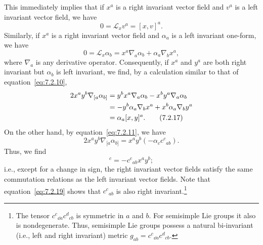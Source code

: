 This immediately implies that if \(x^a\) is a right invariant vector field and
\(v^a\) is a left invariant vector field, we have
\begin{equation}
  0=\mathcal L_xv^a=[x,v]^a .
  \tag{7.2.15}\label{eq:7.2.15}
\end{equation}
Similarly, if \(x^a\) is a right invariant vector field and \(\alpha_a\) is a left
invariant one-form, we have
\begin{equation}
  0=\mathcal L_x\alpha_b
    =x^a\nabla_a\alpha_b+\alpha_a\nabla_bx^a ,
  \tag{7.2.16}\label{eq:7.2.16}
\end{equation}
where \(\nabla_a\) is any derivative operator. Consequently, if \(x^a\) and
\(y^a\) are both right invariant but \(\alpha_b\) is left invariant, we find, by a
calculation similar to that of equation~\eqref{eq:7.2.10},
\begin{align}
  2x^ay^b\nabla_{[a}\alpha_{b]}
    &=y^bx^a\nabla_a\alpha_b-x^by^a\nabla_a\alpha_b \notag\\
    &=-y^b\alpha_a\nabla_bx^a+x^b\alpha_a\nabla_by^a \notag\\
    &=\alpha_a[x,y]^a .
  \tag{7.2.17}\label{eq:7.2.17}
\end{align}
On the other hand, by equation~\eqref{eq:7.2.11}, we have
\begin{equation}
  2x^ay^b\nabla_{[a}\alpha_{b]}
    =x^ay^b(-\alpha_cc^c{}_{ab}) .
  \tag{7.2.18}\label{eq:7.2.18}
\end{equation}
Thus, we find
\begin{equation}
  [x,y]^c=-c^c{}_{ab}x^ay^b ;
  \tag{7.2.19}\label{eq:7.2.19}
\end{equation}
i.e., except for a change in sign, the right invariant vector fields satisfy the same
commutation relations as the left invariant vector fields. Note that
equation~\eqref{eq:7.2.19} shows that \(c^c{}_{ab}\) is also right
invariant.\footnote{The tensor \(c^c{}_{\dd a}c^d{}_{cb}\) is symmetric in \(a\)
and \(b\). For semisimple Lie groups it also is nondegenerate. Thus, semisimple
Lie groups possess a natural bi-invariant (i.e., left and right invariant) metric
\(g_{ab}=c^c{}_{\dd a}c^d{}_{cb}\).}

